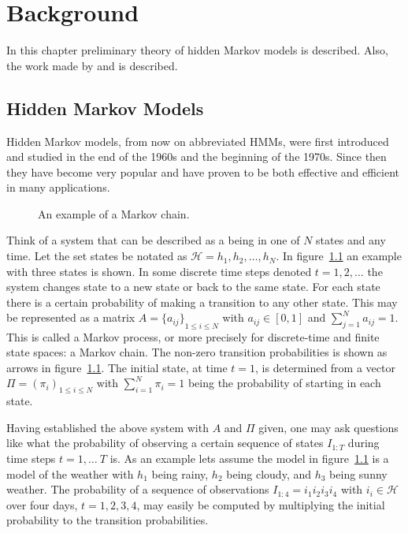 
\chapter{Background}
\label{cha:background}

In this chapter preliminary theory of hidden Markov models is described. Also,
the work made by \citet{lifshits2009speeding} and \citet{sand2013ziphmmlib} is
described.

\section{Hidden Markov Models}
\label{sec:hidden-markov-models}

Hidden Markov models, from now on abbreviated HMMs, were first introduced and
studied in the end of the 1960s and the beginning of the 1970s. Since then they
have become very popular and have proven to be both effective and efficient in
many applications. \citep{rabiner1989tutorial}

\begin{figure}
  \centering
  
  \caption{An example of a Markov chain.}
  \label{fig:markov-chain}
\end{figure}

Think of a system that can be described as a being in one of $N$ states and any
time. Let the set states be notated as $\mathcal{H} = {h_1, h_2, \dots, h_N}$.
In figure~\ref{fig:markov-chain} an example with three states is shown. In some
discrete time steps denoted $t = 1, 2, \dots$ the system changes state to a new
state or back to the same state. For each state there is a certain probability
of making a transition to any other state. This may be represented as a matrix
$A = {\{a_{ij}\}}_{1 \le i \le N}$ with $a_{ij} \in [0, 1]$ and
$\sum_{j = 1}^N a_{ij} = 1$. This is called a Markov process, or more precisely
for discrete-time and finite state spaces: a Markov chain. The non-zero
transition probabilities is shown as arrows in
figure~\ref{fig:markov-chain}. The initial state, at time $t = 1$, is
determined from a vector $\Pi = {(\pi_i)}_{1 \le i \le N}$ with
$\sum_{i=1}^N \pi_i = 1$ being the probability of starting in each state.

Having established the above system with $A$ and $\Pi$ given, one may ask
questions like what the probability of observing a certain sequence of states
$I_{1:T}$ during time steps $t = 1, \dots\ T$ is. As an example lets assume the
model in figure~\ref{fig:markov-chain} is a model of the weather with $h_1$
being rainy, $h_2$ being cloudy, and $h_3$ being sunny weather. The probability
of a sequence of observations $I_{1:4} = i_1i_2i_3i_4$ with
$i_i \in \mathcal{H}$ over four days, $t = 1, 2, 3, 4$, may easily be computed
by multiplying the initial probability to the transition probabilities.

